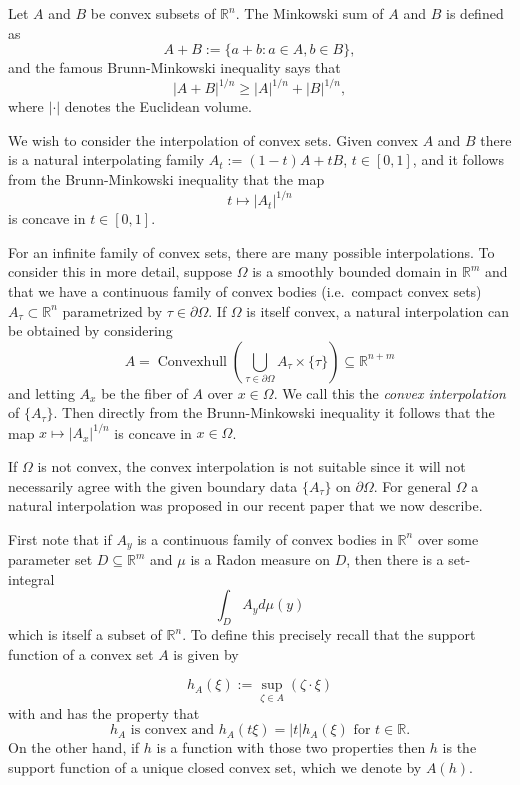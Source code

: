 \documentclass[reqno]{amsart}
\theoremstyle{definition}
\theoremstyle{definition}
\theoremstyle{definition}
\begin{document}
Let $A$ and $B$ be convex subsets of $\mathbb{R}^n$. The Minkowski sum of $A$ and $B$ is defined as $$A+B:=\{a+b: a\in A,b\in B\},$$ and the famous Brunn-Minkowski inequality says that $$|A+B|^{1/n}\geq |A|^{1/n}+|B|^{1/n},$$ where $|\cdot|$ denotes the Euclidean volume.

We wish to consider the interpolation of convex sets.   Given convex $A$ and $B$ there is a natural interpolating family $A_t:=(1-t)A+tB$, $t\in[0,1]$, and it follows from the Brunn-Minkowski inequality that the map $$t\mapsto |A_t|^{1/n}$$ is concave in $t\in [0,1]$.

For an infinite family of convex sets, there are many possible  interpolations.  To consider this in more detail, suppose $\Omega$ is a smoothly bounded domain in $\mathbb R^m$ and that we have a continuous family of convex bodies (i.e.\ compact convex sets) $A_{\tau}\subset \mathbb R^n$ parametrized by $\tau\in \partial \Omega$.   If $\Omega$ is itself convex, a natural interpolation can be obtained by considering $$A = \operatorname{Convexhull}\left(\bigcup_{\tau\in \partial \Omega}A_{\tau}\times \{\tau\}\right)\subseteq \mathbb{R}^{n+m}$$ and letting $A_x$ be the fiber of $A$ over $x\in \Omega$.  We call this the \emph{convex interpolation} of $\{A_{\tau}\}$. Then directly from the Brunn-Minkowski inequality it follows that the map $x\mapsto |A_x|^{1/n}$ is concave in $x\in \Omega$.

If $\Omega$ is not convex, the convex interpolation is not suitable since it will not necessarily agree with the given boundary data $\{A_{\tau}\}$ on $\partial \Omega$.  For general $\Omega$ a natural interpolation was proposed in our recent paper \cite{ross2022interpolation} that we now describe.

First note that if $A_y$ is a continuous family of convex bodies in $\mathbb R^n$ over some parameter set $D\subseteq \mathbb{R}^m$ and $\mu$ is a Radon measure on $D$, then there is a set-integral $$\int_D A_yd\mu(y)$$ 
which is itself a subset of $\mathbb R^n$.   To define this precisely recall that the support function of a convex set $A$ is given by



$$h_A(\xi):=\sup_{\zeta\in A}(\zeta \cdot \xi)$$ with and has the property that
\begin{equation} h_A \text{ is convex and } h_A(t\xi)=|t|h_A(\xi) \text{ for } t\in \mathbb R.\label{eq:supportproperties}\end{equation}
On the other hand, if $h$ is a function with those two properties then $h$ is the support function of a unique closed convex set, which we denote by $A(h)$.
\end{document}
